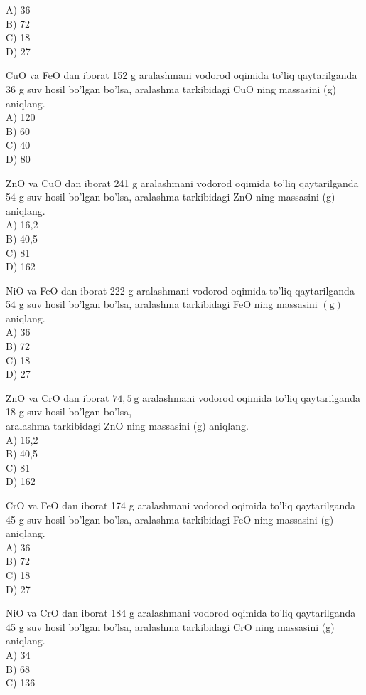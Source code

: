 A) 36\\
B) 72\\
C) 18\\
D) 27
  \item CuO va FeO dan iborat 152 g aralashmani vodorod oqimida to'liq qaytarilganda 36 g suv hosil bo'lgan bo'lsa, aralashma tarkibidagi CuO ning massasini (g) aniqlang.\\
A) 120\\
B) 60\\
C) 40\\
D) 80
  \item ZnO va CuO dan iborat 241 g aralashmani vodorod oqimida to'liq qaytarilganda 54 g suv hosil bo'lgan bo'lsa, aralashma tarkibidagi ZnO ning massasini (g) aniqlang.\\
A) 16,2\\
B) 40,5\\
C) 81\\
D) 162
  \item NiO va FeO dan iborat 222 g aralashmani vodorod oqimida to'liq qaytarilganda 54 g suv hosil bo'lgan bo'lsa, aralashma tarkibidagi FeO ning massasini $(\mathrm{g})$ aniqlang.\\
A) 36\\
B) 72\\
C) 18\\
D) 27
  \item ZnO va CrO dan iborat $74,5 \mathrm{~g}$ aralashmani vodorod oqimida to'liq qaytarilganda 18 g suv hosil bo'lgan bo'lsa,\\
aralashma tarkibidagi ZnO ning massasini (g) aniqlang.\\
A) 16,2\\
B) 40,5\\
C) 81\\
D) 162
  \item CrO va FeO dan iborat 174 g aralashmani vodorod oqimida to'liq qaytarilganda 45 g suv hosil bo'lgan bo'lsa, aralashma tarkibidagi FeO ning massasini (g) aniqlang.\\
A) 36\\
B) 72\\
C) 18\\
D) 27
  \item NiO va CrO dan iborat 184 g aralashmani vodorod oqimida to'liq qaytarilganda 45 g suv hosil bo'lgan bo'lsa, aralashma tarkibidagi CrO ning massasini (g) aniqlang.\\
A) 34\\
B) 68\\
C) 136\\
